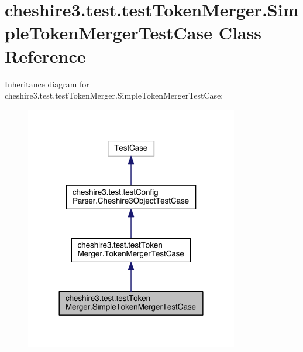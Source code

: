 \hypertarget{classcheshire3_1_1test_1_1test_token_merger_1_1_simple_token_merger_test_case}{\section{cheshire3.\-test.\-test\-Token\-Merger.\-Simple\-Token\-Merger\-Test\-Case Class Reference}
\label{classcheshire3_1_1test_1_1test_token_merger_1_1_simple_token_merger_test_case}
}


Inheritance diagram for cheshire3.\-test.\-test\-Token\-Merger.\-Simple\-Token\-Merger\-Test\-Case\-:
\nopagebreak
\begin{figure}[H]
\begin{center}
\leavevmode
\includegraphics[width=264pt]{classcheshire3_1_1test_1_1test_token_merger_1_1_simple_token_merger_test_case__inherit__graph}
\end{center}
\end{figure}


